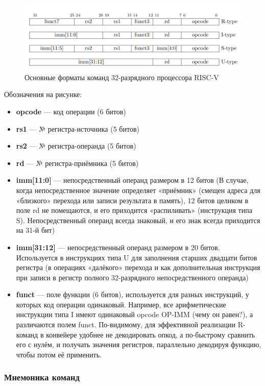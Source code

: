 \begin{figure}[htbp]
    \centering
    \includegraphics[width=1.0\textwidth]{img/RISCV_4_Commands.png}
    \caption{Основные форматы команд 32-разрядного процессора RISC-V}
    \label{command-01}
\end{figure}
Обозначения на рисунке:
\begin{itemize}
    \item \textbf{opcode} — код операции (6 битов)
    \item \textbf{rs1} --- № регистра-источника (5 битов)
    \item \textbf{rs2} --- № регистра-операнда (5 битов)
    \item \textbf{rd} --- № регистра-приёмника (5 битов)
    \item \textbf{imm[11:0]} --- непосредственный операнд размером в 12 битов (В случае, когда непосредственное значение определяет «приёмник» (смещен адреса для «близкого» перехода или записи результата в память), 12 битов целиком в поле rd не помещаются, и его приходится «распиливать» (инструкция типа S). Непосредственный операнд всегда знаковый, и его знак всегда приходится на 31-й бит)
    \item \textbf{imm[31:12]} --- непосредственный операнд размером в 20 битов. Используется в инструкциях типа U для заполнения старших двадцати битов регистра (в операциях «далёкого» перехода и как дополнительная инструкция при записи в регистр полного 32-разрядного непосредственного операнда)
    \item \textbf{funct} --- поле функции (6 битов), используется для разных инструкций, у которых код операции одинаковый. Например, все арифметические инструкции типа I имеют одинаковый opcode OP-IMM (чему он равен?), а различаются полем funct. По-видимому, для эффективной реализации R-команд в конвейере удобнее не декодировать опкод, а по-быстрому сравнить его с нулём, и получать значения регистров, параллельно декодируя функцию, чтобы потом её применить.
\end{itemize}

\subsubsection{Мнемоника команд}

